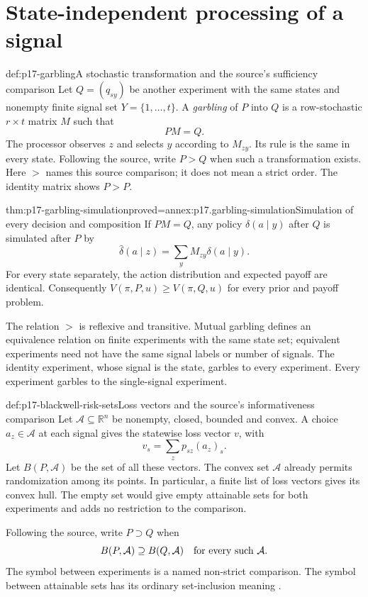 \section{State-independent processing of a signal}
\label{sec:p17-garbling}

\begin{hbdefinition}{def:p17-garbling}{A stochastic transformation and the source's sufficiency comparison}
Let \(Q=(q_{sy})\) be another experiment with the same states and
nonempty finite signal set \(Y=\{1,\ldots,t\}\).
A \emph{garbling} of \(P\) into \(Q\) is a row-stochastic
\(r\times t\) matrix \(M\) such that
\[
                         PM=Q.
\]
The processor observes \(z\) and selects \(y\) according to \(M_{zy}\).
Its rule is the same in every state.
Following the source, write \(P>Q\) when such a transformation exists.
Here \(>\) names this source comparison; it does not mean a strict order.
The identity matrix shows \(P>P\).
\end{hbdefinition}

\begin{hbtheorem}{thm:p17-garbling-simulation}{proved=annex:p17.garbling-simulation}{Simulation of every decision and composition}
If \(PM=Q\), any policy \(\delta(a\mid y)\) after \(Q\) is simulated
after \(P\) by
\[
                    \widehat\delta(a\mid z)
                      =\sum_y M_{zy}\delta(a\mid y).
\]
For every state separately, the action distribution and expected payoff
are identical. Consequently \(V(\pi,P,u)\geq V(\pi,Q,u)\) for every
prior and payoff problem.

The relation \(>\) is reflexive and transitive. Mutual garbling defines
an equivalence relation on finite experiments with the same state set;
equivalent experiments need not have the same signal labels or number of
signals. The identity experiment, whose signal is the state, garbles to
every experiment. Every experiment garbles to the single-signal experiment.
\end{hbtheorem}

\begin{hbdefinition}{def:p17-blackwell-risk-sets}{Loss vectors and the source's informativeness comparison}
Let \(\mathcal A\subseteq\mathbb R^n\) be nonempty, closed, bounded and
convex. A choice \(a_z\in\mathcal A\) at each signal gives the statewise
loss vector \(v\), with
\[
 v_s=\sum_z p_{sz}(a_z)_s.
\]
Let \(B(P,\mathcal A)\) be the set of all these vectors.
The convex set \(\mathcal A\) already permits randomization among its
points. In particular, a finite list of loss vectors gives its convex hull.
The empty set would give empty attainable sets for both experiments and
adds no restriction to the comparison.

Following the source, write \(P\supset Q\) when
\[
       B(P,\mathcal A)\supseteq B(Q,\mathcal A)
       \quad\hbox{for every such }\mathcal A.
\]
The symbol between experiments is a named non-strict comparison.
The symbol between attainable sets has its ordinary set-inclusion meaning
\cite[pp.~265--267]{Blackwell1953EquivalentExperiments}.
\end{hbdefinition}

